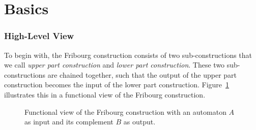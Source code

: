 

\section{Basics}
\label{3_basics}

\subsubsection{High-Level View}
To begin with, the Fribourg construction consists of two sub-constructions that we call \textit{upper part construction} and \textit{lower part construction}. These two sub-constructions are chained together, such that the output of the upper part construction becomes the input of the lower part construction. Figure~\ref{fribourg_construction} illustrates this in a functional view of the Fribourg construction.

\begin{figure}[htb]
\centering
\FribourgConstruction
\caption{Functional view of the Fribourg construction with an automaton $A$ as input and its complement $B$ as output.}
\label{fribourg_construction}
\end{figure}

